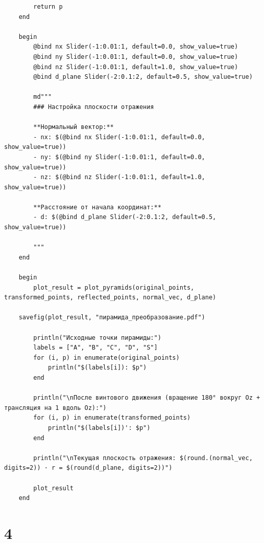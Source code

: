 \begin{verbatim}
        return p
    end

    begin
        @bind nx Slider(-1:0.01:1, default=0.0, show_value=true)
        @bind ny Slider(-1:0.01:1, default=0.0, show_value=true)
        @bind nz Slider(-1:0.01:1, default=1.0, show_value=true)
        @bind d_plane Slider(-2:0.1:2, default=0.5, show_value=true)

        md"""
        ### Настройка плоскости отражения

        **Нормальный вектор:**
        - nx: $(@bind nx Slider(-1:0.01:1, default=0.0, show_value=true))
        - ny: $(@bind ny Slider(-1:0.01:1, default=0.0, show_value=true))
        - nz: $(@bind nz Slider(-1:0.01:1, default=1.0, show_value=true))

        **Расстояние от начала координат:**
        - d: $(@bind d_plane Slider(-2:0.1:2, default=0.5, show_value=true))

        """
    end

    begin
        plot_result = plot_pyramids(original_points, transformed_points, reflected_points, normal_vec, d_plane)

    savefig(plot_result, "пирамида_преобразование.pdf")

        println("Исходные точки пирамиды:")
        labels = ["A", "B", "C", "D", "S"]
        for (i, p) in enumerate(original_points)
            println("$(labels[i]): $p")
        end

        println("\nПосле винтового движения (вращение 180° вокруг Oz + трансляция на 1 вдоль Oz):")
        for (i, p) in enumerate(transformed_points)
            println("$(labels[i])': $p")
        end

        println("\nТекущая плоскость отражения: $(round.(normal_vec, digits=2)) · r = $(round(d_plane, digits=2))")

        plot_result
    end

\end{verbatim}

\chapter{4}

